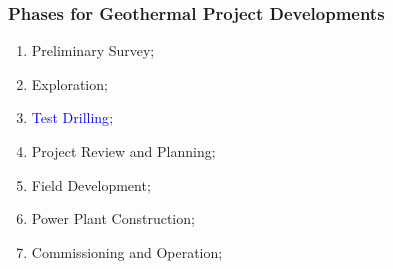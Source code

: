 \documentclass[10pt,compress]{beamer}
\newcommand{\blue}{\textcolor{blue}}
\begin{document}
\begin{frame}
\begin{frame}
 \frametitle{Phases for Geothermal Project Developments} 
    \begin{enumerate}[1.]
       \item <1-> Preliminary Survey;
       \item <1-> Exploration; 
       \item <2-> \blue{Test Drilling};
       \item <1-> Project Review and Planning;
       \item <1-> Field Development; 
       \item <1-> Power Plant Construction;
       \item <1-> Commissioning and Operation;
    \end{enumerate}
\end{frame}



\end{frame}
\end{document}
